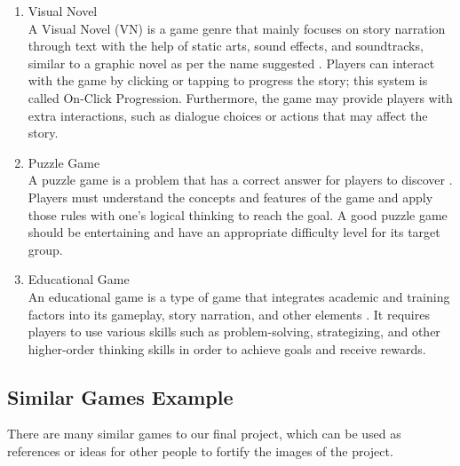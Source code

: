 \documentclass[12pt,oneside,openright,a4paper]{cpe-english-project}
\begin{document}
\begin{enumerate}
	\item Visual Novel \\
	A Visual Novel (VN) is a game genre that mainly focuses on story narration through text with the help of static arts, sound effects, and soundtracks, similar to a graphic novel as per the name suggested \cite{camingue2021visualnovel}. Players can interact with the game by clicking or tapping to progress the story; this system is called On-Click Progression. Furthermore, the game may provide players with extra interactions, such as dialogue choices or actions that may affect the story.
	\item Puzzle Game \\
	A puzzle game is a problem that has a correct answer for players to discover \cite{zhang2019puzzle}. Players must understand the concepts and features of the game and apply those rules with one’s logical thinking to reach the goal. A good puzzle game should be entertaining and have an appropriate difficulty level for its target group.
	\item Educational Game \\
	An educational game is a type of game that integrates academic and training factors into its gameplay, story narration, and other elements \cite{dondlinger2007educational}. It requires players to use various skills such as problem-solving, strategizing, and other higher-order thinking skills in order to achieve goals and receive rewards.
\end{enumerate}

\subsection{Similar Games Example}
There are many similar games to our final project, which can be used as references or ideas for other people to fortify the images of the project.
\end{document}
